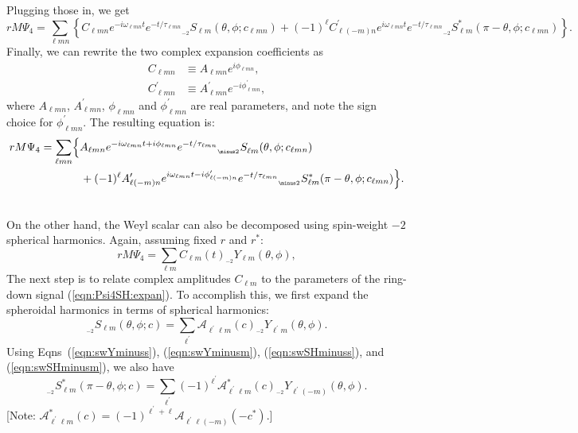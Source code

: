 \documentclass[11pt]{article}
\newcommand{\swY}[4][]{{}_{{}_{#2}}\!Y^{#1}_{#3}(#4)}
\newcommand{\swSH}[5][]{{}_{{}_{#2}}S^{#1}_{#3}(#4;#5)}
\newcommand{\YSH}[3][]{\mathcal{A}^{#1}_{#2}(#3)}
\begin{document}
\noindent
Plugging those in, we get
\begin{equation}
\nonumber rM\Psi_4 = \sum_{\ell{m}n} \left\{C_{\ell{m}n} e^{-i\omega_{\ell{m}n}t}e^{-t/\tau_{\ell{m}n}} \swSH{\minus 2}{\ell{m}}{\theta,\phi}{c_{\ell{m}n}}
  + (-1)^\ell C^\prime_{\ell(-m)n} e^{i\omega_{\ell{m}n}t}e^{-t/\tau_{\ell{m}n}} \swSH[*]{\minus 2}{\ell{m}}{\pi-\theta,\phi}{c_{\ell{m}n}} \right\}.
\end{equation}
Finally, we can rewrite the two complex expansion coefficients as
\begin{align}
  C_{\ell{m}n} &\equiv A_{\ell{m}n}e^{i\phi_{\ell{m}n}}, \\
  C^\prime_{\ell{m}n} &\equiv A^\prime_{\ell{m}n}e^{-i\phi^\prime_{\ell{m}n}},
\end{align}
where $A_{\ell{m}n}$, $A^\prime_{\ell{m}n}$, $\phi_{\ell{m}n}$ and
$\phi^\prime_{\ell{m}n}$ are real parameters, and note the sign choice
for $\phi^\prime_{\ell{m}n}$.  The resulting equation is:
\begin{align} \label{eqn:Psi4SH:expan}
\nonumber rM\Psi_4 &= \sum_{\ell{m}n} \Bigl\{A_{\ell{m}n} e^{-i\omega_{\ell{m}n}t+i\phi_{\ell{m}n}}e^{-t/\tau_{\ell{m}n}} \swSH{\minus 2}{\ell{m}}{\theta,\phi}{c_{\ell{m}n}} \nonumber\\ & {} \hspace{0.5in}
  + (-1)^\ell A^\prime_{\ell(-m)n} e^{i\omega_{\ell{m}n}t-i\phi^\prime_{\ell(-m)n}}e^{-t/\tau_{\ell{m}n}} \swSH[*]{\minus 2}{\ell{m}}{\pi-\theta,\phi}{c_{\ell{m}n}} \Bigr\}.
\end{align}

\noindent\\
On the other hand, the Weyl scalar can also be decomposed using spin-weight $\minus 2$ spherical harmonics.  Again, assuming fixed $r$ and $r^*$:
\begin{equation}\label{eqn:Psi4Y:expan}
rM\Psi_4 = \sum_{\ell{m}} C_{\ell{m}}(t) \swY{\minus 2}{\ell{m}}{\theta,\phi},
\end{equation} 
The next step is to relate complex amplitudes $C_{\ell{m}}$ to the parameters of the ring-down signal (\ref{eqn:Psi4SH:expan}).  To accomplish this, we first expand the spheroidal harmonics in terms of spherical harmonics:
\begin{equation} \label{eqn:swSH:expan}
\swSH{\minus 2}{\ell{m}}{\theta,\phi}{c} = \sum_{\ell^\prime} \YSH{\ell^\prime\ell{m}}{c} \swY{\minus 2}{\ell^\prime{m}}{\theta,\phi}.
\end{equation}
Using Eqns~(\ref{eqn:swYminuss}), (\ref{eqn:swYminusm}), (\ref{eqn:swSHminuss}), and (\ref{eqn:swSHminusm}), we also have
\begin{equation} \label{eqn:swSconj:expan}
\swSH[*]{\minus 2}{\ell{m}}{\pi-\theta,\phi}{c} = \sum_{\ell^\prime} (-1)^{\ell^\prime}\YSH[*]{\ell^\prime\ell{m}}{c} \swY{\minus 2}{\ell^\prime(-m)}{\theta,\phi}.
\end{equation}
[Note: $\YSH[*]{\ell^\prime\ell{m}}{c} = (-1)^{\ell^\prime+\ell}\YSH{\ell^\prime\ell(-m)}{-c^*}$.]
\end{document}
